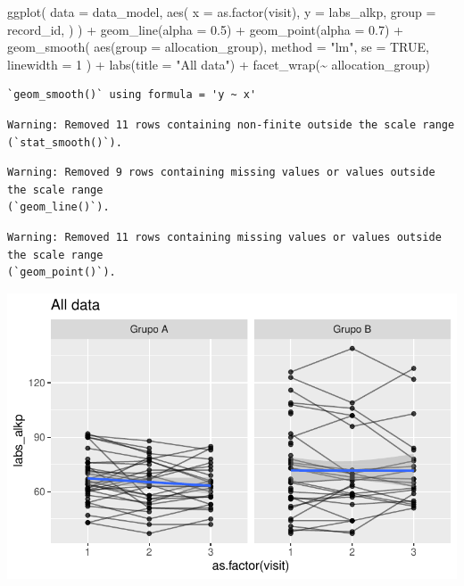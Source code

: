\documentclass[
  letterpaper,
  DIV=11,
  numbers=noendperiod]{scrartcl}
\newenvironment{Shaded}{\begin{snugshade}}{\end{snugshade}}
\newcommand{\AttributeTok}[1]{\textcolor[rgb]{0.40,0.45,0.13}{#1}}
\newcommand{\ConstantTok}[1]{\textcolor[rgb]{0.56,0.35,0.01}{#1}}
\newcommand{\DecValTok}[1]{\textcolor[rgb]{0.68,0.00,0.00}{#1}}
\newcommand{\FloatTok}[1]{\textcolor[rgb]{0.68,0.00,0.00}{#1}}
\newcommand{\FunctionTok}[1]{\textcolor[rgb]{0.28,0.35,0.67}{#1}}
\newcommand{\NormalTok}[1]{\textcolor[rgb]{0.00,0.23,0.31}{#1}}
\newcommand{\SpecialCharTok}[1]{\textcolor[rgb]{0.37,0.37,0.37}{#1}}
\newcommand{\StringTok}[1]{\textcolor[rgb]{0.13,0.47,0.30}{#1}}
\begin{document}
\begin{Shaded}
\begin{Highlighting}[]
\FunctionTok{ggplot}\NormalTok{(}
    \AttributeTok{data =}\NormalTok{ data\_model, }
    \FunctionTok{aes}\NormalTok{(}
        \AttributeTok{x =} \FunctionTok{as.factor}\NormalTok{(visit),}
        \AttributeTok{y =}\NormalTok{ labs\_alkp,}
        \AttributeTok{group =}\NormalTok{ record\_id,}
\NormalTok{    )}
\NormalTok{) }\SpecialCharTok{+}
    \FunctionTok{geom\_line}\NormalTok{(}\AttributeTok{alpha =} \FloatTok{0.5}\NormalTok{) }\SpecialCharTok{+}
    \FunctionTok{geom\_point}\NormalTok{(}\AttributeTok{alpha =} \FloatTok{0.7}\NormalTok{) }\SpecialCharTok{+}
    \FunctionTok{geom\_smooth}\NormalTok{(}
        \FunctionTok{aes}\NormalTok{(}\AttributeTok{group =}\NormalTok{ allocation\_group),}
        \AttributeTok{method =} \StringTok{"lm"}\NormalTok{,}
        \AttributeTok{se =} \ConstantTok{TRUE}\NormalTok{,}
        \AttributeTok{linewidth =} \DecValTok{1}
\NormalTok{    ) }\SpecialCharTok{+}
    \FunctionTok{labs}\NormalTok{(}\AttributeTok{title =} \StringTok{"All data"}\NormalTok{) }\SpecialCharTok{+}
    \FunctionTok{facet\_wrap}\NormalTok{(}\SpecialCharTok{\textasciitilde{}}\NormalTok{ allocation\_group) }
\end{Highlighting}
\end{Shaded}

\begin{verbatim}
`geom_smooth()` using formula = 'y ~ x'
\end{verbatim}

\begin{verbatim}
Warning: Removed 11 rows containing non-finite outside the scale range
(`stat_smooth()`).
\end{verbatim}

\begin{verbatim}
Warning: Removed 9 rows containing missing values or values outside the scale range
(`geom_line()`).
\end{verbatim}

\begin{verbatim}
Warning: Removed 11 rows containing missing values or values outside the scale range
(`geom_point()`).
\end{verbatim}

\includegraphics{Outcomes_V1V2V3_files/figure-pdf/labs_alkp_6-1.pdf}
\end{document}
